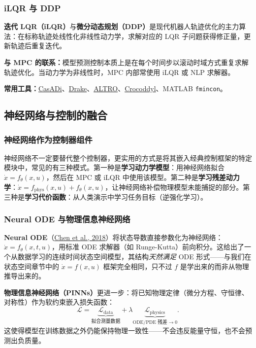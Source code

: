 \subsubsection{iLQR 与 DDP}

\textbf{迭代 LQR（iLQR）}与\textbf{微分动态规划（DDP）}是现代机器人轨迹优化的主力算法：在标称轨迹处线性化非线性动力学，求解对应的 LQR 子问题获得修正量，更新轨迹后重复迭代。

\textbf{与 MPC 的联系：}模型预测控制本质上是在每个时间步以滚动时域方式重复求解轨迹优化。当动力学为非线性时，MPC 内部常使用 iLQR 或 NLP 求解器。

\textbf{常用工具：}\href{https://web.casadi.org/}{CasADi}、\href{https://drake.mit.edu/}{Drake}、\href{https://arxiv.org/abs/2007.01850}{ALTRO}、\href{https://github.com/loco-3d/crocoddyl}{Crocoddyl}、MATLAB \texttt{fmincon}。

\subsection{神经网络与控制的融合}

\subsubsection{神经网络作为控制器组件}

神经网络不一定要替代整个控制器，更实用的方式是将其嵌入经典控制框架的特定模块中，常见的有三种模式。第一种是\textbf{学习动力学模型}：用神经网络拟合 $\dot{x} = f_\theta(x, u)$，然后在 MPC 或 iLQR 中使用该模型。第二种是\textbf{学习残差动力学}：$\dot{x} = f_{\mathrm{phys}}(x, u) + f_\theta(x, u)$，让神经网络补偿物理模型未能捕捉的部分。第三种是\textbf{学习代价函数}：从人类演示中学习任务目标（逆强化学习）。

\subsubsection{Neural ODE 与物理信息神经网络}

\textbf{Neural ODE}（\href{https://arxiv.org/abs/1806.07366}{Chen et al., 2018}）将状态导数直接参数化为神经网络：$\dot{x} = f_\theta(x, t, u)$，用标准 ODE 求解器（如 Runge-Kutta）前向积分。这给出了一个从数据学习的连续时间状态空间模型，其结构\emph{天然满足} ODE 形式——与我们在状态空间章节中的 $\dot{x} = f(x, u)$ 框架完全相同，只不过 $f$ 是学出来的而非从物理推导出来的。

\textbf{物理信息神经网络（PINNs）}更进一步：将已知物理定律（微分方程、守恒律、对称性）作为软约束嵌入损失函数：
\[
\mathcal{L} = \underbrace{\mathcal{L}_{\text{data}}}_{\text{拟合测量数据}} + \lambda \underbrace{\mathcal{L}_{\text{physics}}}_{\text{ODE/PDE 残差} \to 0}.
\]
这使得模型在训练数据之外仍能保持物理一致性——不会违反能量守恒，也不会预测出负质量。

